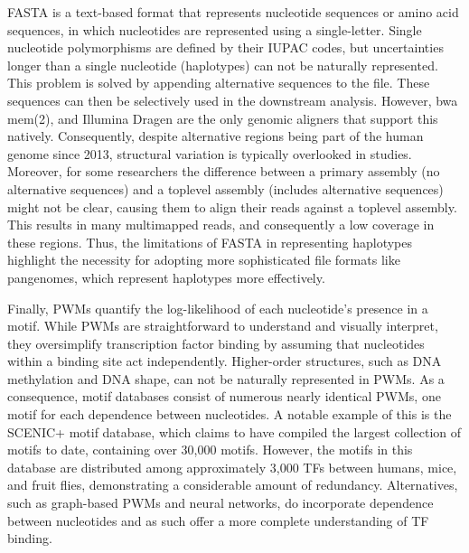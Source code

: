 FASTA is a text-based format that represents nucleotide sequences or amino acid sequences, in which nucleotides are represented using a single-letter\cite{Lipman1985}. Single nucleotide polymorphisms are defined by their IUPAC codes, but uncertainties longer than a single nucleotide (haplotypes) can not be naturally represented. This problem is solved by appending alternative sequences to the file. These sequences can then be selectively used in the downstream analysis. However, bwa mem(2)\cite{bwamem,bwamem2}, and Illumina Dragen are the only genomic aligners that support this natively. Consequently, despite alternative regions being part of the human genome since 2013, structural variation is typically overlooked in studies. Moreover, for some researchers the difference between a primary assembly (no alternative sequences) and a toplevel assembly (includes alternative sequences) might not be clear, causing them to align their reads against a toplevel assembly. This results in many multimapped reads, and consequently a low coverage in these regions. Thus, the limitations of FASTA in representing haplotypes highlight the necessity for adopting more sophisticated file formats like pangenomes\cite{Li2020}, which represent haplotypes more effectively.

Finally, PWMs quantify the log-likelihood of each nucleotide's presence in a motif. While PWMs are straightforward to understand and visually interpret, they oversimplify transcription factor binding by assuming that nucleotides within a binding site act independently\cite{Zuo2014,Jolma2015,Inukai2017}. Higher-order structures, such as DNA methylation and DNA shape, can not be naturally represented in PWMs. As a consequence, motif databases consist of numerous nearly identical PWMs, one motif for each dependence between nucleotides. A notable example of this is the SCENIC+ motif database\cite{BravoGonzlezBlas2023}, which claims to have compiled the largest collection of motifs to date, containing over 30,000  motifs. However, the motifs in this database are distributed among approximately 3,000 TFs between humans, mice, and fruit flies, demonstrating a considerable amount of redundancy. Alternatives, such as graph-based PWMs\cite{Siebert2016} and neural networks\cite{Novakovsky2023,https://doi.org/10.48550/arxiv.1704.02685}, do incorporate dependence between nucleotides and as such offer a more complete understanding of TF binding.

